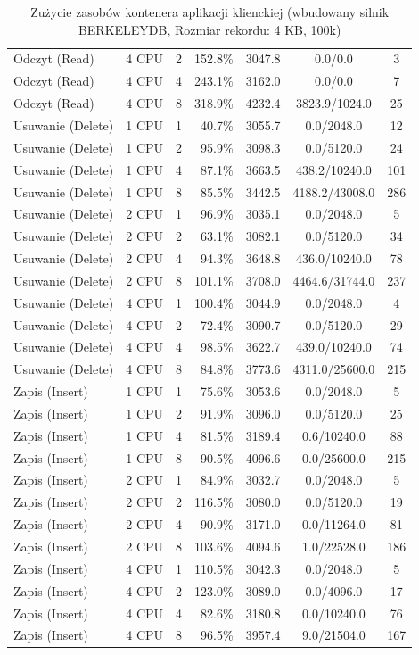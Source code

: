 \begin{table}[ht]
{\begin{tabular}{llcrrcc}
Odczyt (Read) & 4 CPU & 2 & 152.8\% & 3047.8 & 0.0/0.0 & 3 \\
Odczyt (Read) & 4 CPU & 4 & 243.1\% & 3162.0 & 0.0/0.0 & 7 \\
Odczyt (Read) & 4 CPU & 8 & 318.9\% & 4232.4 & 3823.9/1024.0 & 25 \\
Usuwanie (Delete) & 1 CPU & 1 & 40.7\% & 3055.7 & 0.0/2048.0 & 12 \\
Usuwanie (Delete) & 1 CPU & 2 & 95.9\% & 3098.3 & 0.0/5120.0 & 24 \\
Usuwanie (Delete) & 1 CPU & 4 & 87.1\% & 3663.5 & 438.2/10240.0 & 101 \\
Usuwanie (Delete) & 1 CPU & 8 & 85.5\% & 3442.5 & 4188.2/43008.0 & 286 \\
Usuwanie (Delete) & 2 CPU & 1 & 96.9\% & 3035.1 & 0.0/2048.0 & 5 \\
Usuwanie (Delete) & 2 CPU & 2 & 63.1\% & 3082.1 & 0.0/5120.0 & 34 \\
Usuwanie (Delete) & 2 CPU & 4 & 94.3\% & 3648.8 & 436.0/10240.0 & 78 \\
Usuwanie (Delete) & 2 CPU & 8 & 101.1\% & 3708.0 & 4464.6/31744.0 & 237 \\
Usuwanie (Delete) & 4 CPU & 1 & 100.4\% & 3044.9 & 0.0/2048.0 & 4 \\
Usuwanie (Delete) & 4 CPU & 2 & 72.4\% & 3090.7 & 0.0/5120.0 & 29 \\
Usuwanie (Delete) & 4 CPU & 4 & 98.5\% & 3622.7 & 439.0/10240.0 & 74 \\
Usuwanie (Delete) & 4 CPU & 8 & 84.8\% & 3773.6 & 4311.0/25600.0 & 215 \\
Zapis (Insert) & 1 CPU & 1 & 75.6\% & 3053.6 & 0.0/2048.0 & 5 \\
Zapis (Insert) & 1 CPU & 2 & 91.9\% & 3096.0 & 0.0/5120.0 & 25 \\
Zapis (Insert) & 1 CPU & 4 & 81.5\% & 3189.4 & 0.6/10240.0 & 88 \\
Zapis (Insert) & 1 CPU & 8 & 90.5\% & 4096.6 & 0.0/25600.0 & 215 \\
Zapis (Insert) & 2 CPU & 1 & 84.9\% & 3032.7 & 0.0/2048.0 & 5 \\
Zapis (Insert) & 2 CPU & 2 & 116.5\% & 3080.0 & 0.0/5120.0 & 19 \\
Zapis (Insert) & 2 CPU & 4 & 90.9\% & 3171.0 & 0.0/11264.0 & 81 \\
Zapis (Insert) & 2 CPU & 8 & 103.6\% & 4094.6 & 1.0/22528.0 & 186 \\
Zapis (Insert) & 4 CPU & 1 & 110.5\% & 3042.3 & 0.0/2048.0 & 5 \\
Zapis (Insert) & 4 CPU & 2 & 123.0\% & 3089.0 & 0.0/4096.0 & 17 \\
Zapis (Insert) & 4 CPU & 4 & 82.6\% & 3180.8 & 0.0/10240.0 & 76 \\
Zapis (Insert) & 4 CPU & 8 & 96.5\% & 3957.4 & 9.0/21504.0 & 167 \\
\bottomrule
\end{tabular}%
}
\caption{Zużycie zasobów kontenera aplikacji klienckiej (wbudowany silnik BERKELEYDB, Rozmiar rekordu: 4 KB, 100k)}
\label{tab:resources_berkeleydb_medium_100000}
\end{table}

